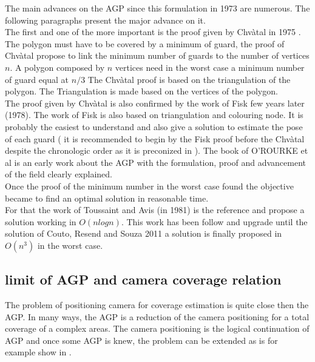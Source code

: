 	The main advances on the AGP since this formulation in 1973 are numerous. The following paragraphs present the major advance on it.\\
	 The first and one of the more important is the proof given by Chvàtal in 1975 \cite{44*chvatal1975}.  The polygon must have to be covered by a minimum of guard, the proof of Chvàtal propose to link the minimum number of guards to the number of vertices $n$. 
A polygon composed by $n$ vertices need in the worst case a minimum number of guard equal at $n/3$ The Chvàtal proof is based on the triangulation of the polygon. The Triangulation is made based on the vertices of the polygon.\\
	     The proof given by Chvàtal is also confirmed by the work of Fisk  few years later (1978). The work of Fisk is also based on triangulation and colouring node. It is probably the easiest to understand and also give a solution to estimate the pose of each guard ( it is recommended to begin by the Fisk proof before the Chvàtal despite the chronologic order as it is preconized in \cite{219*orourke1987}). The book of O'ROURKE et al \cite{219*orourke1987} is an early work about the AGP with the formulation, proof and advancement of the field clearly explained. \\
Once the proof of the minimum number in the worst case found the objective became to find an optimal solution in reasonable time. \\
For that the work of Toussaint and Avis (in 1981) is the reference and propose a solution working in $O(n log n)$. This work has been follow and upgrade until the solution of Couto, Resend and Souza  2011 \cite{224*couto2011} a solution is finally proposed in $O(n^3)$  in the worst case. 


	
	\subsection{limit of AGP and camera coverage relation}


The problem of positioning camera for coverage estimation is quite close then the AGP. In many ways, the AGP is a reduction of the camera positioning for a total coverage of a complex areas. The camera positioning is the logical continuation of AGP and once some AGP is knew, the problem can be extended as is for  example show in \cite{221*fleishman2000,33*reddy2012,43*erdem2006}.

